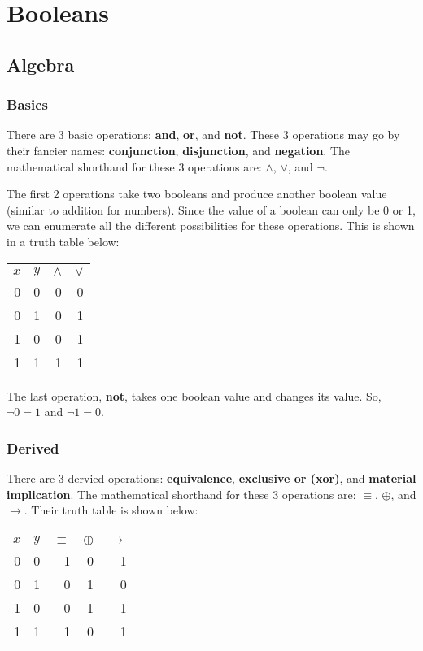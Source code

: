 \chapter{Booleans}

\section{Algebra}

\subsection{Basics}

There are 3 basic operations: \textbf{and}, \textbf{or}, and \textbf{not}. These
3 operations may go by their fancier names: \textbf{conjunction},
\textbf{disjunction}, and \textbf{negation}. The mathematical shorthand for
these 3 operations are: $\land$, $\lor$, and $\lnot$.

The first 2 operations take two booleans and produce another boolean value
(similar to addition for numbers). Since the value of a boolean can only be 0 or
1, we can enumerate all the different possibilities for these operations.  This
is shown in a truth table below:

\begin{center}
  \begin{tabular}{r r | r | r}
    $x$ & $y$ & $\land$ & $\lor$ \\
    \hline
    0 &   0 &       0 &      0 \\
    0 &   1 &       0 &      1 \\
    1 &   0 &       0 &      1 \\
    1 &   1 &       1 &      1 \\
  \end{tabular}
\end{center}

The last operation, \textbf{not}, takes one boolean value and changes its
value. So, $\lnot 0 = 1$ and $\lnot 1 = 0$.

\subsection{Derived}

There are 3 dervied operations: \textbf{equivalence}, \textbf{exclusive or
(xor)}, and \textbf{material implication}. The mathematical shorthand for these
3 operations are: $\equiv$, $\oplus$, and $\to$. Their truth table is shown
below:

\begin{center}
  \begin{tabular}{r r | r | r | r}
    $x$ & $y$ & $\equiv$ & $\oplus$ & $\to$ \\
    \hline
    0 &   0 &        1 &        0 &     1 \\
    0 &   1 &        0 &        1 &     0 \\
    1 &   0 &        0 &        1 &     1 \\
    1 &   1 &        1 &        0 &     1 \\
  \end{tabular}
\end{center}
